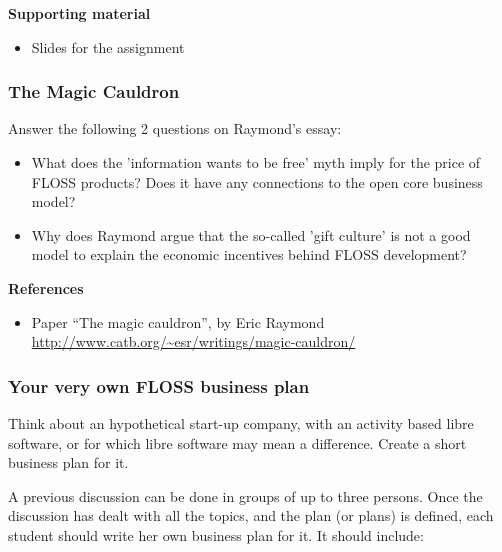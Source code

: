 \documentclass[a4paper]{article}
\begin{document}
\textbf{Supporting material}

\begin{itemize}
\item Slides for the assignment
\end{itemize}

\subsubsection{The Magic Cauldron}
\label{sub:business-magic-cauldron}

Answer the following 2 questions on Raymond's essay:

\begin{itemize}
\item What does the 'information wants to be free' myth imply for the price of FLOSS products? Does it have any connections to the open core business model?
\item Why does Raymond argue that the so-called 'gift culture' is not a good model to explain the economic incentives behind FLOSS development?
\end{itemize}

\textbf{References}

\begin{itemize}
\item Paper ``The magic cauldron'', by Eric Raymond \\
  \url{http://www.catb.org/~esr/writings/magic-cauldron/}
\end{itemize}

\subsubsection{Your very own FLOSS business plan}
\label{sub:business-plan}

Think about an hypothetical start-up company, with an activity based libre software, or for which libre software may mean a difference. Create a short business plan for it.

A previous discussion can be done in groups of up to three persons. Once the discussion has dealt with all the topics, and the plan (or plans) is defined, each student should write her own business plan for it. It should include:
\end{document}
